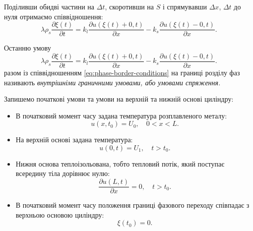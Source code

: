 Поділивши обидві частини на $\Delta t$, скоротивши на $S$ і спрямувавши $\Delta x$, $\Delta t$ до нуля отримаємо співвідношення:
\begin{equation}
	\lambda \rho_s \frac{\partial \xi(t)}{\partial t} = k_l \frac{\partial u(\xi(t) + 0, t)}{\partial x} - k_s \frac{\partial u(\xi(t) - 0, t)}{\partial x}.
\end{equation}

\begin{definition}
	Останню умову 
	\begin{equation}
		\label{eq:conjugate-conditions}
		\lambda \rho_s \frac{\partial \xi(t)}{\partial t} = k_l \frac{\partial u(\xi(t) + 0, t)}{\partial x} - k_s \frac{\partial u(\xi(t) - 0, t)}{\partial x}.
	\end{equation}
	разом із співвідношенням \eqref{eq:phase-border-conditions} на границі розділу фаз називають \it{внутрішніми граничними умовами}, або \it{умовами спряження}.
\end{definition}

Запишемо початкові умови та умови на верхній та нижній основі циліндру:
\begin{itemize}
	\item В початковий момент часу задана температура розплавленого металу:
	\begin{equation}
		\label{eq:start-time-temp}
		u(x, t_0) = U_0, \quad 0 < x < L.
	\end{equation}
	
	\item На верхній основі задана температура:
	\begin{equation}
		\label{eq:upper-cylinder-border-temp}
		u(0, t) = U_1, \quad t > t_0.
	\end{equation}

	\item Нижня основа теплоізольована, тобто тепловий потік, який поступає всередину тіла дорівнює нулю:
	\begin{equation}
		\label{eq:lower-cylinder-border-temp-flow}
		\frac{\partial u(L, t)}{\partial x} = 0, \quad t > t_0.
	\end{equation}
	
	\item В початковий момент часу положення границі фазового переходу співпадає з верхньою основою циліндру: 
	\begin{equation}
		\label{eq:start-time-xi}
		\xi(t_0) = 0.
	\end{equation}
\end{itemize}

